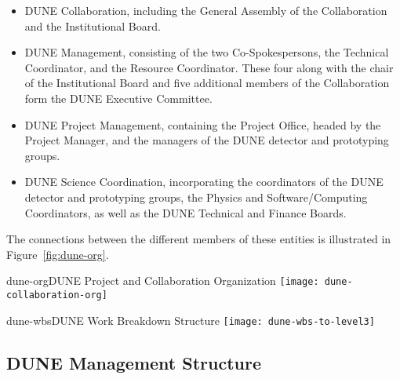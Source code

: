 \begin{itemize}
\item DUNE Collaboration, including the General Assembly of the Collaboration and the Institutional Board. %
\item DUNE Management, consisting of the two Co-Spokespersons, the Technical Coordinator, and the Resource Coordinator.  These four along with the chair of the Institutional Board and five additional members of the Collaboration form the DUNE Executive Committee.
\item DUNE Project Management, containing the Project Office, headed by the Project Manager, and the managers of the DUNE detector and prototyping groups. 
\item DUNE Science Coordination, incorporating the coordinators of the DUNE detector and prototyping groups, the Physics and Software/Computing Coordinators, as well as the DUNE Technical and Finance Boards.
\end{itemize}
The connections between the different members of these entities is illustrated in Figure~\ref{fig:dune-org}.


\begin{cdrfigure}{dune-org}{DUNE Project and Collaboration Organization}
  \texttt{[image: dune-collaboration-org]}
\end{cdrfigure}

\begin{cdrfigure}{dune-wbs}{DUNE Work Breakdown Structure}
  \texttt{[image: dune-wbs-to-level3]}
\end{cdrfigure}

\subsection{DUNE Management Structure}

